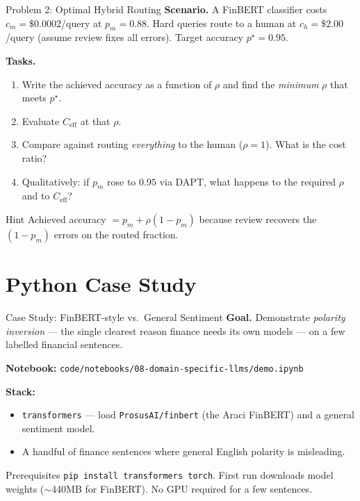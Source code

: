 \documentclass[9pt,t]{beamer}
\begin{document}
\begin{frame}{Problem 2: Optimal Hybrid Routing}
\textbf{Scenario.} A FinBERT classifier costs $c_m=\$0.0002$/query at $p_m=0.88$.
Hard queries route to a human at $c_h=\$2.00$/query (assume review fixes all errors).
Target accuracy $p^\star = 0.95$.

\medskip
\textbf{Tasks.}
\begin{enumerate}
  \item[\textbf{A.}] Write the achieved accuracy as a function of $\rho$ and find the
        \emph{minimum} $\rho$ that meets $p^\star$.
  \item[\textbf{B.}] Evaluate $C_{\text{eff}}$ at that $\rho$.
  \item[\textbf{C.}] Compare against routing \emph{everything} to the human ($\rho=1$).
        What is the cost ratio?
  \item[\textbf{D.}] Qualitatively: if $p_m$ rose to $0.95$ via DAPT, what happens to
        the required $\rho$ and to $C_{\text{eff}}$?
\end{enumerate}

\medskip
\begin{block}{Hint}
Achieved accuracy $= p_m + \rho(1-p_m)$ because review recovers the $(1-p_m)$ errors
on the routed fraction.
\end{block}
\end{frame}

\section{Python Case Study}

\begin{frame}{Case Study: FinBERT-style vs.\ General Sentiment}
\textbf{Goal.} Demonstrate \emph{polarity inversion} --- the single clearest reason
finance needs its own models --- on a few labelled financial sentences.

\medskip
\textbf{Notebook:} \texttt{code/notebooks/08-domain-specific-llms/demo.ipynb}

\medskip
\textbf{Stack:}
\begin{itemize}
  \item \texttt{transformers} --- load \texttt{ProsusAI/finbert} (the Araci FinBERT)
        and a general sentiment model.
  \item A handful of finance sentences where general English polarity is misleading.
\end{itemize}

\medskip
\begin{alertblock}{Prerequisites}
\texttt{pip install transformers torch}. First run downloads model weights
($\sim$440MB for FinBERT). No GPU required for a few sentences.
\end{alertblock}
\end{frame}
\end{document}

